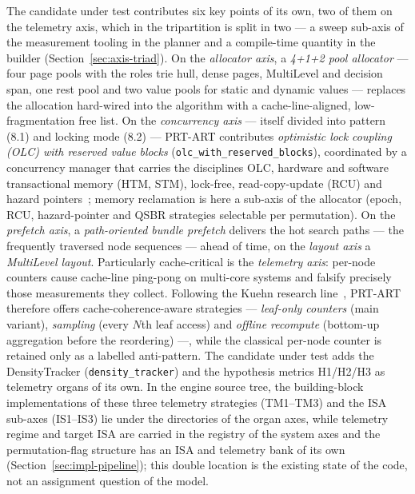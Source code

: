 \begin{nurlang}
The candidate under test contributes six key points of its own, two of them on the telemetry axis, which in the
tripartition is split in two --- a sweep sub-axis of the measurement tooling in the planner and a
compile-time quantity in the builder (Section~\ref{sec:axis-triad}). On the \emph{allocator axis}, a
\emph{4+1+2 pool allocator} --- four page pools with the roles trie hull, dense pages, MultiLevel and
decision span, one rest pool and two value pools for static and dynamic values --- replaces the
allocation hard-wired into the algorithm with a cache-line-aligned, low-fragmentation free list. On the
\emph{concurrency axis} --- itself divided into pattern (8.1) and locking mode (8.2) --- PRT-ART
contributes \emph{optimistic lock coupling (OLC) with reserved value blocks}
(\texttt{olc\_\allowbreak{}with\_\allowbreak{}reserved\_\allowbreak{}blocks}), coordinated by a
concurrency manager that carries the disciplines OLC, hardware and software transactional memory (HTM,
STM), lock-free, read-copy-update (RCU) and hazard pointers~\cite{michael2004hazard}; memory
reclamation is here a sub-axis of the allocator (epoch, RCU, hazard-pointer and QSBR strategies
selectable per permutation). On the \emph{prefetch axis}, a \emph{path-oriented bundle prefetch}
delivers the hot search paths --- the frequently traversed node sequences --- ahead of time, on the
\emph{layout axis} a \emph{MultiLevel layout}. Particularly
cache-critical is the \emph{telemetry axis}: per-node counters cause cache-line ping-pong on
multi-core systems and falsify precisely those measurements they collect. Following the Kuehn research
line~\cite{kuehn2023bplustree}, PRT-ART therefore offers cache-coherence-aware strategies ---
\emph{leaf-only counters} (main variant), \emph{sampling} (every $N$th leaf access) and \emph{offline
recompute} (bottom-up aggregation before the reordering) ---, while the classical per-node counter is
retained only as a labelled anti-pattern. The candidate under test adds the DensityTracker
(\texttt{density\_\allowbreak{}tracker}) and the hypothesis metrics H1/H2/H3 as telemetry organs of
its own.
In the engine source tree, the building-block implementations of these three telemetry strategies
(TM1--TM3) and the ISA sub-axes (IS1--IS3) lie under the directories of the organ axes, while telemetry
regime and target ISA are carried in the registry of the system axes and the permutation-flag structure
has an ISA and telemetry bank of its own (Section~\ref{sec:impl-pipeline}); this double location is the
existing state of the code, not an assignment question of the model.


\end{nurlang}
